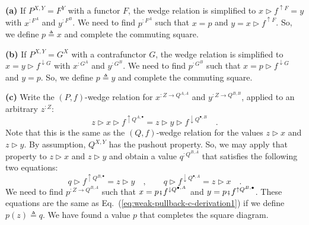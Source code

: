 \textbf{(a)} If $P^{X,Y}=F^{Y}$ with a functor $F$, the wedge relation
is simplified to $x\triangleright f^{\uparrow F}=y$ with $x^{:F^{A}}$
and $y^{:F^{B}}$. We need to find $p^{:F^{A}}$ such that $x=p$
and $y=x\triangleright f^{\uparrow F}$. So, we define $p\triangleq x$
and complete the commuting square.

\textbf{(b)} If $P^{X,Y}=G^{X}$ with a contrafunctor $G$, the wedge
relation is simplified to $x=y\triangleright f^{\downarrow G}$ with
$x^{:G^{A}}$ and $y^{:G^{B}}$. We need to find $p^{:G^{B}}$ such
that $x=p\triangleright f^{\downarrow G}$ and $y=p$. So, we define
$p\triangleq y$ and complete the commuting square.

\textbf{(c)} Write the $\left(P,f\right)$-wedge relation for $x^{:Z\rightarrow Q^{A,A}}$
and $y^{:Z\rightarrow Q^{B,B}}$, applied to an arbitrary $z^{:Z}$:
\[
z\triangleright x\triangleright f^{\uparrow Q^{A,\bullet}}=z\triangleright y\triangleright f^{\downarrow Q^{\bullet,B}}\quad.
\]
Note that this is the same as the $\left(Q,f\right)$-wedge relation
for the values $z\triangleright x$ and $z\triangleright y$. By assumption,
$Q^{X,Y}$ has the pushout property. So, we may apply that property
to $z\triangleright x$ and $z\triangleright y$ and obtain a value
$q^{:Q^{B,A}}$ that satisfies the following two equations:
\begin{equation}
q\triangleright f^{\uparrow Q^{B,\bullet}}=z\triangleright y\quad,\quad\quad q\triangleright f^{\downarrow Q^{\bullet,A}}=z\triangleright x\quad.\label{eq:weak-pullback-c-derivation1}
\end{equation}
We need to find $p^{:Z\rightarrow Q^{B,A}}$ such that $x=p\bef f^{\downarrow Q^{\bullet,A}}$
and $y=p\bef f^{\uparrow Q^{B,\bullet}}$. These equations are the
same as Eq.~(\ref{eq:weak-pullback-c-derivation1}) if we define
$p(z)\triangleq q$. We have found a value $p$ that completes the
square diagram.

